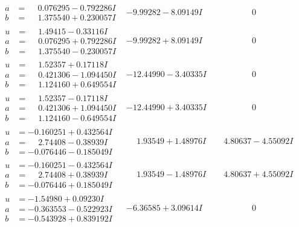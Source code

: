 \documentclass[1p]{elsarticle_modified}
\theoremstyle{definition}
\begin{document}
$$\begin{array}{c|c|c}
\begin{aligned}
a &= \phantom{-}0.076295 - 0.792286 I \\
b &= \phantom{-}1.375540 + 0.230057 I\end{aligned}
 & -9.99282 - 8.09149 I & \phantom{-0.000000 } 0 \\ \hline\begin{aligned}
u &= \phantom{-}1.49415 - 0.33116 I \\
a &= \phantom{-}0.076295 + 0.792286 I \\
b &= \phantom{-}1.375540 - 0.230057 I\end{aligned}
 & -9.99282 + 8.09149 I & \phantom{-0.000000 } 0 \\ \hline\begin{aligned}
u &= \phantom{-}1.52357 + 0.17118 I \\
a &= \phantom{-}0.421306 - 1.094450 I \\
b &= \phantom{-}1.124160 + 0.649554 I\end{aligned}
 & -12.44990 - 3.40335 I & \phantom{-0.000000 } 0 \\ \hline\begin{aligned}
u &= \phantom{-}1.52357 - 0.17118 I \\
a &= \phantom{-}0.421306 + 1.094450 I \\
b &= \phantom{-}1.124160 - 0.649554 I\end{aligned}
 & -12.44990 + 3.40335 I & \phantom{-0.000000 } 0 \\ \hline\begin{aligned}
u &= -0.160251 + 0.432564 I \\
a &= \phantom{-}2.74408 - 0.38939 I \\
b &= -0.076446 - 0.185049 I\end{aligned}
 & \phantom{-}1.93549 + 1.48976 I & \phantom{-}4.80637 - 4.55092 I \\ \hline\begin{aligned}
u &= -0.160251 - 0.432564 I \\
a &= \phantom{-}2.74408 + 0.38939 I \\
b &= -0.076446 + 0.185049 I\end{aligned}
 & \phantom{-}1.93549 - 1.48976 I & \phantom{-}4.80637 + 4.55092 I \\ \hline\begin{aligned}
u &= -1.54980 + 0.09230 I \\
a &= -0.363553 - 0.522923 I \\
b &= -0.543928 + 0.839192 I\end{aligned}
 & -6.36585 + 3.09614 I & \phantom{-0.000000 } 0 \\ \hline\begin{aligned}

\end{aligned}
\end{array}$$
\end{document}
